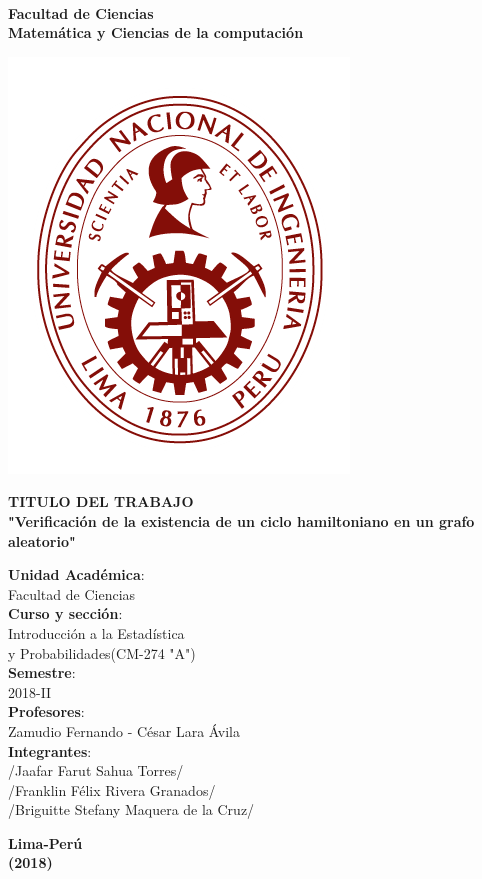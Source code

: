 \documentclass[letterpaper, 10 pt, conference]{ieeeconf}
\begin{document}
	\begin{center}
	\LARGE {}\\
	{\bf Facultad de Ciencias}\\
	{\bf Matemática y Ciencias de la computaci{\'o}n}
	\end{center}

	\begin{center}
	\begin{minipage}[c]{10cm}
	\includegraphics[scale=0.95]{uni.PNG}
	\end{minipage}
	\end{center}
	\begin{center}
	\LARGE \textbf{TITULO DEL TRABAJO}\\
	{\bf "Verificaci{\'o}n de la existencia de un ciclo hamiltoniano en un grafo aleatorio"}
	\end{center}
	\begin{center}
	\Large \textbf{Unidad Acad{\'e}mica}: 
	\\Facultad de Ciencias\\
	\textbf{Curso y secci{\'o}n}: 
	\\Introducci{\'o}n a la Estad{\'i}stica\\ y Probabilidades(CM-274 "A")\\
	\textbf{Semestre}: 
	\\2018-II\\
	\textbf{Profesores}:
	\\ Zamudio Fernando - C{\'e}sar Lara Ávila\\
	\textbf{Integrantes}:\\
	/Jaafar Farut Sahua Torres/\\
	/Franklin F{\'e}lix Rivera Granados/\\
	/Briguitte Stefany Maquera de la Cruz/\\
	\end{center}
	\begin{center}
	\LARGE \vfill\textbf{Lima-Per{\'u}}\\
	\textbf{(2018)}
	\end{center}
\end{document}
